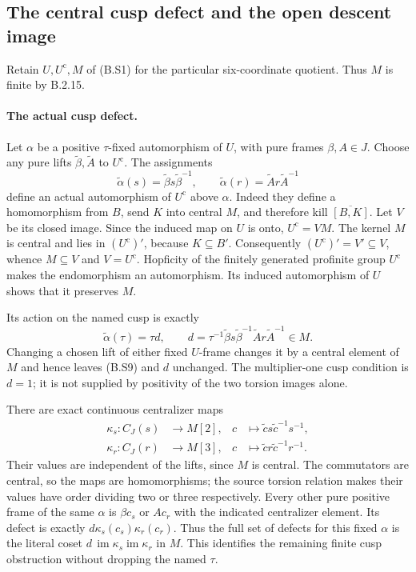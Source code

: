 \subsection{The central cusp defect and the open descent image}

Retain $U,U^{\mathrm c},M$ of (B.S1) for the particular
six-coordinate quotient.  Thus $M$ is finite by B.2.15.

\paragraph{The actual cusp defect.}
Let $\alpha$ be a positive $\tau$-fixed automorphism of $U$,
with pure frames $\beta,A\in J$.  Choose any pure lifts
$\widetilde\beta,\widetilde A$ to $U^{\mathrm c}$.
The assignments
\[
 \widetilde\alpha(s)=\widetilde\beta s\widetilde\beta^{-1},
 \qquad
 \widetilde\alpha(r)=\widetilde A r\widetilde A^{-1}            \tag{B.S9}
\]
define an actual automorphism of $U^{\mathrm c}$ above
$\alpha$.  Indeed they define a homomorphism from $B$,
send $K$ into central $M$, and therefore kill
$\overline{[B,K]}$.  Let $V$ be its closed image.  Since
the induced map on $U$ is onto, $U^{\mathrm c}=VM$.
The kernel $M$ is central and lies in
$(U^{\mathrm c})'$, because $K\subseteq B'$.
Consequently $(U^{\mathrm c})'=V'\subseteq V$, whence
$M\subseteq V$ and $V=U^{\mathrm c}$.  Hopficity of
the finitely generated profinite group $U^{\mathrm c}$
makes the endomorphism an automorphism.  Its induced
automorphism of $U$ shows that it preserves $M$.

Its action on the named cusp is exactly
\[
 \widetilde\alpha(\tau)=\tau d,\qquad
 d=\tau^{-1}\widetilde\beta s\widetilde\beta^{-1}
                       \widetilde A r\widetilde A^{-1}\in M.
                                                                  \tag{B.S10}
\]
Changing a chosen lift of either fixed $U$-frame changes
it by a central element of $M$ and hence leaves (B.S9)
and $d$ unchanged.  The multiplier-one cusp condition is
$d=1$; it is not supplied by positivity of the two torsion
images alone.

There are exact continuous centralizer maps
\[
\begin{aligned}
 \kappa_s:C_J(s)&\longrightarrow M[2],&
          c&\longmapsto\widetilde c s\widetilde c^{-1}s^{-1},\\
 \kappa_r:C_J(r)&\longrightarrow M[3],&
          c&\longmapsto\widetilde c r\widetilde c^{-1}r^{-1}.
\end{aligned}                                                   \tag{B.S11}
\]
Their values are independent of the lifts, since $M$ is
central.  The commutators are central, so the maps are
homomorphisms; the source torsion relation makes their
values have order dividing two or three respectively.
Every other pure positive frame of the same $\alpha$ is
$\beta c_s$ or $Ac_r$ with the indicated centralizer
element.  Its defect is exactly
$d\kappa_s(c_s)\kappa_r(c_r)$.  Thus the full set of defects
for this fixed $\alpha$ is the literal coset
$d\,\operatorname{im}\kappa_s\operatorname{im}\kappa_r$ in $M$.
This identifies the remaining finite cusp obstruction
without dropping the named $\tau$.

